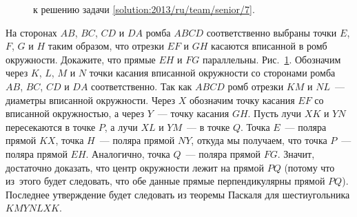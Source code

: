 \ifsolution
\begin{figure}\centering
    \caption{к решению задачи \ref{solution:2013/ru/team/senior/7}.}
    \label{fig:solution:2013/ru/team/senior/7}
\end{figure}
\fi %

\problem{}
На сторонах $AB$, $BC$, $CD$ и $DA$ ромба $ABCD$ соответственно выбраны точки
$E$, $F$, $G$ и $H$ таким образом, что отрезки $EF$ и $GH$ касаются вписанной в
ромб окружности.
Докажите, что прямые $EH$ и $FG$ параллельны.
\solution
\label{solution:2013/ru/team/senior/7}
Рис.~\ref{fig:solution:2013/ru/team/senior/7}.
Обозначим через $K$, $L$, $M$ и $N$ точки касания вписанной окружности со
сторонами ромба $AB$, $BC$, $CD$ и $DA$ соответственно.
Так как $ABCD$ ромб отрезки $KM$ и $NL$~--- диаметры вписанной окружности.
Через $X$ обозначим точку касания $EF$ со вписанной окружностью, а через
$Y$~--- точку касания $GH$.
Пусть лучи $XK$ и $YN$ пересекаются в точке $P$, а лучи $XL$ и $YM$~--- в точке
$Q$.
Точка $E$~--- поляра прямой $KX$, точка $H$~--- поляра прямой $NY$, откуда мы
получаем, что точка $P$~--- поляра прямой $EH$.
Аналогично, точка $Q$~--- поляра прямой $FG$.
Значит, достаточно доказать, что центр окружности лежит на прямой $PQ$
(потому что из~этого будет следовать, что обе данные прямые перпендикулярны
прямой $PQ$).
Последнее утверждение будет следовать из теоремы Паскаля для шестиугольника
$KMYNLXK$.
\endproblem

